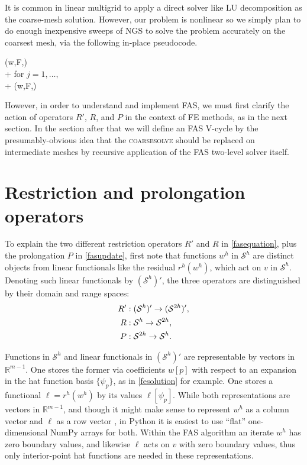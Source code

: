 \documentclass[letterpaper,final,12pt,reqno]{amsart}
\newcommand{\RR}{\mathbb{R}}
\begin{document}
It is common in linear multigrid \cite{Briggsetal2000,Bueler2021,Trottenbergetal2001} to apply a direct solver like LU decomposition as the coarse-mesh solution.  However, our problem is nonlinear so we simply plan to do enough inexpensive sweeps of NGS to solve the problem accurately on the coarsest mesh, via the following in-place pseudocode.

\begin{pseudo*}
(w,F,\ell)\text{:} \\+
    for $j=1,\dots,$ \\+
        (w,F,\ell)
\end{pseudo*}

However, in order to understand and implement FAS, we must first clarify the action of operators $R'$, $R$, and $P$ in the context of FE methods, as in the next section.  In the section after that we will define an FAS V-cycle by the presumably-obvious idea that the \textsc{coarsesolve} should be replaced on intermediate meshes by recursive application of the FAS two-level solver itself.


\section{Restriction and prolongation operators}

To explain the two different restriction operators $R'$ and $R$ in \eqref{fasequation}, plus the prolongation $P$ in \eqref{fasupdate}, first note that functions $w^h$ in $\mathcal{S}^h$ are distinct objects from linear functionals like the residual $r^h(w^h)$, which act on $v$ in $\mathcal{S}^h$.  Denoting such linear functionals by $(\mathcal{S}^h)'$, the three operators are distinguished by their domain and range spaces:
\begin{align}
  R' &: (\mathcal{S}^h)' \to (\mathcal{S}^{2h})', \label{rpoperators} \\
  R  &: \mathcal{S}^h \to \mathcal{S}^{2h}, \notag \\
  P  &: \mathcal{S}^{2h} \to \mathcal{S}^h. \notag
\end{align}

Functions in $\mathcal{S}^h$ and linear functionals in $(\mathcal{S}^h)'$ are representable by vectors in $\RR^{m-1}$.  One stores the former via coefficients $w[p]$ with respect to an expansion in the hat function basis $\{\psi_p\}$, as in \eqref{fesolution} for example.  One stores a functional $\ell=r^h(w^h)$ by its values $\ell[\psi_p]$.  While both representations are vectors in $\RR^{m-1}$, and though it might make sense to represent $w^h$ as a column vector and $\ell$ as a row vector \cite{TrefethenBau1997}, in Python it is easiest to use ``flat'' one-dimensional NumPy arrays for both.  Within the FAS algorithm an iterate $w^h$ has zero boundary values, and likewise $\ell$ acts on $v$ with zero boundary values, thus only interior-point hat functions are needed in these representations.
\end{document}
